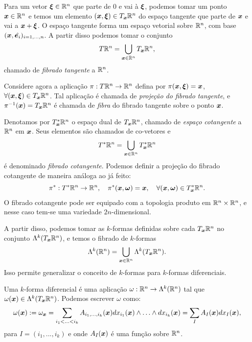 Para um vetor $\bm \xi \in \mathbb{R}^n$ que parte de $0$ e vai à $\bm \xi$, podemos tomar um ponto $\bm x \in \mathbb{R}^n$ e temos um elemento $(\bm x, \bm \xi) \in T_{\bm x} \mathbb{R}^n$ do espaço tangente que parte de $\bm x$ e vai a $\bm x + \bm \xi$. O espaço tangente forma um espaço vetorial sobre $\mathbb{R}^n$, com base $(\bm x, \hat{\bm e_i})_{i=1,...,n}$. A partir disso podemos tomar o conjunto
\begin{equation*}
    T \mathbb{R}^n = \bigcup_{\bm x \in \mathbb{R}^n} T_{\bm x} \mathbb{R}^n,
\end{equation*}
chamado de \textit{fibrado tangente} a $\mathbb{R}^n$.

Considere agora a aplicação $\pi: T \mathbb{R}^n \to \mathbb{R}^n$ defina por $\pi (\bm x, \bm \xi) = \bm x$, $\forall (\bm x, \bm \xi) \in T_{\bm x} \mathbb{R}^n$. Tal aplicação é chamada de \textit{projeção do fibrado tangente}, e $\pi^{-1} (\bm x) = T_{\bm x} \mathbb{R}^n$ é chamada de \textit{fibra} do fibrado tangente sobre o ponto $\bm x$.

Denotamos por $T_{\bm x}^* \mathbb{R}^n$ o espaço dual de $T_{\bm x} \mathbb{R}^n$, chamado de \textit{espaço cotangente} a $\mathbb{R}^n$ em $\bm x$. Seus elementos são chamados de co-vetores e
\begin{equation*}
    T^* \mathbb{R}^n = \bigcup_{\bm x \in \mathbb{R}^n} T_{\bm x}^* \mathbb{R}^n
\end{equation*}
é denominado \textit{fibrado cotangente}. Podemos definir a projeção do fibrado cotangente de maneira análoga ao já feito:
\begin{equation*}
    \pi^*: T^* \mathbb{R}^n \to \mathbb{R}^n,
    \quad
    \pi^*(\bm x, \bm \omega) = \bm x, \quad \forall (\bm x, \bm \omega) \in T_{\bm x}^* \mathbb{R}^n.
\end{equation*}
O fibrado cotangente pode ser equipado com a topologia produto em $\mathbb{R}^n \times \mathbb{R}^n$, e nesse caso tem-se uma variedade $2n$-dimensional.

A partir disso, podemos tomar as $k$-formas definidas sobre cada $T_{\bm x} \mathbb{R}^n$ no conjunto $\Lambda^k (T_{\bm x} \mathbb{R}^n)$, e temos o fibrado de $k$-formas
\begin{equation*}
    \Lambda^k (\mathbb{R}^n) = \bigcup_{\bm x \in \mathbb{R}^n} \Lambda^k (T_{\bm x} \mathbb{R}^n).
\end{equation*}
Isso permite generalizar o conceito de $k$-formas para $k$-formas diferenciais.

\begin{definition}
    Uma $k$-forma diferencial é uma aplicação $\omega: \mathbb{R}^n \to \Lambda^k(\mathbb{R}^n)$ tal que $\omega(\bm x) \in \Lambda^k(T_{\bm x} \mathbb{R}^n)$. Podemos escrever $\omega$ como:
    \begin{equation*}
        \omega(\bm x) := \omega_{\bm x} = \sum_{i_1 < \hdots < i_k} A_{i_1,...,i_k} (\bm x) dx_{i_1}(\bm x) \wedge \hdots \wedge dx_{i_k} (\bm x) = \sum_{I} A_I (\bm x) dx_I (\bm x),
    \end{equation*}
    para $I = (i_1, ..., i_k)$ e onde $A_{I} (\bm x)$ é uma função sobre $\mathbb{R}^n$.
\end{definition}

